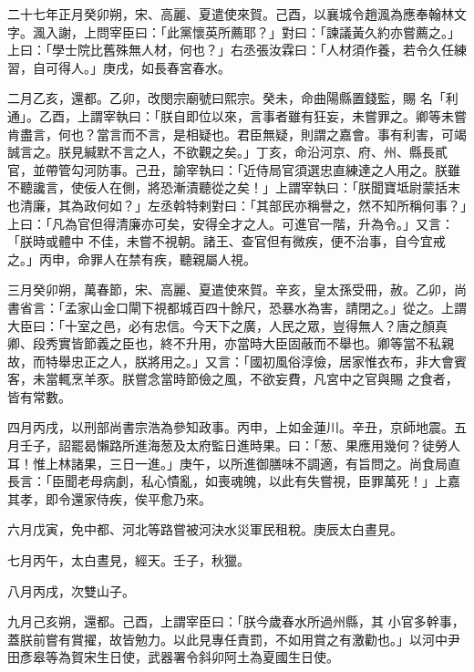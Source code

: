 \begin{pinyinscope}
 二十七年正月癸卯朔，宋、高麗、夏遣使來賀。己酉，以襄城令趙渢為應奉翰林文字。渢入謝，上問宰臣曰：「此黨懷英所薦耶？」對曰：「諫議黃久約亦嘗薦之。」上曰：「學士院比舊殊無人材，何也？」右丞張汝霖曰：「人材須作養，若令久任練習，自可得人。」庚戌，如長春宮春水。



 二月乙亥，還都。乙卯，改閔宗廟號曰熙宗。癸未，命曲陽縣置錢監，賜
 名「利通」。乙酉，上謂宰執曰：「朕自即位以來，言事者雖有狂妄，未嘗罪之。卿等未嘗肯盡言，何也？當言而不言，是相疑也。君臣無疑，則謂之嘉會。事有利害，可竭誠言之。朕見緘默不言之人，不欲觀之矣。」丁亥，命沿河京、府、州、縣長貳官，並帶管勾河防事。己丑，諭宰執曰：「近侍局官須選忠直練達之人用之。朕雖不聽讒言，使佞人在側，將恐漸漬聽從之矣！」上謂宰執曰：「朕聞寶坻尉蒙括末也清廉，其為政何如？」左丞斡特剌對曰：「其部民亦稱譽之，然不知所稱何事？」上曰：「凡為官但得清廉亦可矣，安得全才之人。可進官一階，升為令。」又言：「朕時或體中
 不佳，未嘗不視朝。諸王、查官但有微疾，便不治事，自今宜戒之。」丙申，命罪人在禁有疾，聽親屬人視。



 三月癸卯朔，萬春節，宋、高麗、夏遣使來賀。辛亥，皇太孫受冊，赦。乙卯，尚書省言：「孟家山金口閘下視都城百四十餘尺，恐暴水為害，請閉之。」從之。上謂大臣曰：「十室之邑，必有忠信。今天下之廣，人民之眾，豈得無人？唐之顏真卿、段秀實皆節義之臣也，終不升用，亦當時大臣固蔽而不舉也。卿等當不私親故，而特舉忠正之人，朕將用之。」又言：「國初風俗淳儉，居家惟衣布，非大會賓客，未當輒烹羊豕。朕嘗念當時節儉之風，不欲妄費，凡宮中之官與賜
 之食者，皆有常數。



 四月丙戌，以刑部尚書宗浩為參知政事。丙申，上如金蓮川。辛丑，京師地震。五月壬子，詔罷曷懶路所進海葱及太府監日進時果。曰：「葱、果應用幾何？徒勞人耳！惟上林諸果，三日一進。」庚午，以所進御膳味不調適，有旨問之。尚食局直長言：「臣聞老母病劇，私心憒亂，如喪魂魄，以此有失嘗視，臣罪萬死！」上嘉其孝，即令還家侍疾，俟平愈乃來。



 六月戊寅，免中都、河北等路嘗被河決水災軍民租稅。庚辰太白晝見。



 七月丙午，太白晝見，經天。壬子，秋獵。



 八月丙戌，次雙山子。



 九月己亥朔，還都。己酉，上謂宰臣曰：「朕今歲春水所過州縣，其
 小官多幹事，蓋朕前嘗有賞擢，故皆勉力。以此見專任責罰，不如用賞之有激勸也。」以河中尹田彥皋等為賀宋生日使，武器署令斜卯阿土為夏國生日使。




\end{pinyinscope}

